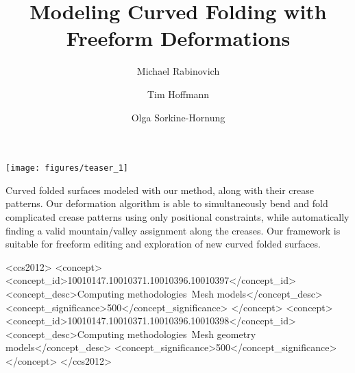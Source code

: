 \documentclass[acmtog]{acmart}
\begin{document}
\title{Modeling Curved Folding with Freeform Deformations}

\author{Michael Rabinovich}
\author{Tim Hoffmann}
\author{Olga Sorkine-Hornung}
\renewcommand{\shortauthors}{Rabinovich, Hoffmann, Sorkine-Hornung}

\begin{teaserfigure}
  \centering
  \texttt{[image: figures/teaser\_1]}
  \caption{\label{fig:teaser} Curved folded surfaces modeled with our method, along with their crease patterns. Our deformation algorithm is able to simultaneously bend and fold complicated crease patterns using only positional constraints, while automatically finding a valid mountain/valley assignment along the creases. Our framework is suitable for freeform editing and exploration of new curved folded surfaces.
}
\end{teaserfigure}
\begin{abstract}

\end{abstract}


%
%
\begin{CCSXML}
<ccs2012>
<concept>
<concept_id>10010147.10010371.10010396.10010397</concept_id>
<concept_desc>Computing methodologies~Mesh models</concept_desc>
<concept_significance>500</concept_significance>
</concept>
<concept>
<concept_id>10010147.10010371.10010396.10010398</concept_id>
<concept_desc>Computing methodologies~Mesh geometry models</concept_desc>
<concept_significance>500</concept_significance>
</concept>
</ccs2012>
\end{CCSXML}


%
%
\end{document}
